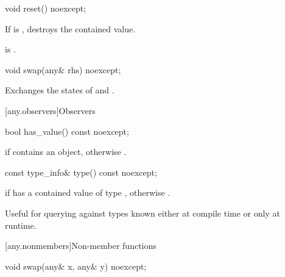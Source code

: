 %
\begin{itemdecl}
void reset() noexcept;
\end{itemdecl}

\begin{itemdescr}
\pnum
\effects
If  is , destroys the contained value.

\pnum
\ensures
{} is .
\end{itemdescr}

%
\begin{itemdecl}
void swap(any& rhs) noexcept;
\end{itemdecl}

\begin{itemdescr}

\pnum
\effects
Exchanges the states of  and .
\end{itemdescr}

[any.observers]{Observers}

%
\begin{itemdecl}
bool has_value() const noexcept;
\end{itemdecl}

\begin{itemdescr}
\pnum
\returns
{} if  contains an object, otherwise .
\end{itemdescr}

%
\begin{itemdecl}
const type_info& type() const noexcept;
\end{itemdecl}

\begin{itemdescr}
\pnum
\returns
{} if  has a contained value of type ,
otherwise .

\pnum
\begin{note}
Useful for querying against types known either at compile time or only at runtime.
\end{note}
\end{itemdescr}

[any.nonmembers]{Non-member functions}

%
\begin{itemdecl}
void swap(any& x, any& y) noexcept;
\end{itemdecl}

